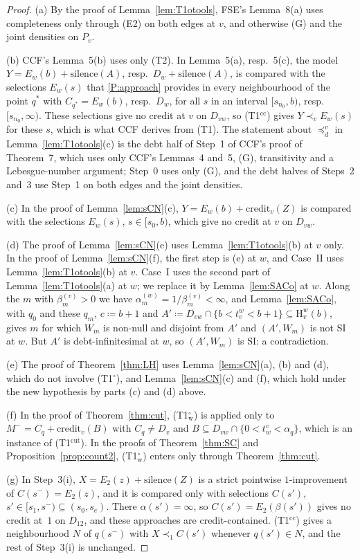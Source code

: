 \documentclass[11pt]{article}
\theoremstyle{definition}\newtheorem{definition}[theorem]{Definition}
\theoremstyle{remark}\newtheorem{remark}[theorem]{Remark}
\newcommand{\cred}{\mathrm{credit}}
\newcommand{\sil}{\mathrm{silence}}
\newcommand{\Hi}[3]{\mathrm H^{#1}_{#2}(#3)}
\newcommand{\Tw}{\textup{(T1$^\circ_{\mathrm w}$)}}
\newcommand{\To}{\textup{(T1$^\circ$)}}
\newcommand{\Tcc}{\textup{(T1$^{\mathrm{cc}}$)}}
\newcommand{\Tcut}{\textup{(T1$^{\mathrm{cut}}$)}}
\begin{document}
\begin{proof}
(a) By the proof of Lemma~\ref{lem:T1otools}, FSE's Lemma~8(a) uses
completeness only through (E2) on both edges at $v$, and otherwise (G) and
the joint densities on $P_v$.

(b) CCF's Lemma~5(b) uses only (T2). In Lemma~5(a), resp.\ 5(c), the model
$Y=E_w(b)+\sil(A)$, resp.\ $D_w+\sil(A)$, is compared with the selections
$E_w(s)$ that \ref{P:approach} provides in every neighbourhood of the point
$q^*$ with $C_{q^*}=E_w(b)$, resp.\ $D_w$, for all $s$ in an interval
$[s_{n_0},b)$, resp.\ $[s_{n_0},\infty)$. These selections give no credit
at $v$ on $D_{vw}$, so \Tcc{} gives $Y\prec_vE_w(s)$ for these $s$, which is
what CCF derives from (T1). The statement about $\preceq^v_d$ in
Lemma~\ref{lem:T1otools}(c) is the debt half of Step~1 of CCF's proof of
Theorem~7, which uses only CCF's Lemmas~4 and~5, (G), transitivity and a
Lebesgue-number argument; Step~0 uses only (G), and the debt halves of
Steps~2 and~3 use Step~1 on both edges and the joint densities.

(c) In the proof of Lemma~\ref{lem:sCN}(c), $Y=E_w(b)+\cred_v(Z)$ is
compared with the selections $E_w(s)$, $s\in[s_0,b)$, which give no credit
at $v$ on $D_{vw}$.

(d) The proof of Lemma~\ref{lem:sCN}(e) uses Lemma~\ref{lem:T1otools}(b) at
$v$ only. In the proof of Lemma~\ref{lem:sCN}(f), the first step is (e) at
$w$, and Case~II uses Lemma~\ref{lem:T1otools}(b) at $v$. Case~I uses the
second part of Lemma~\ref{lem:T1otools}(a) at $w$; we replace it by
Lemma~\ref{lem:SACo} at $w$. Along the $m$ with $\beta^{(v)}_m>0$ we have
$\alpha^{(w)}_m=1/\beta^{(v)}_m<\infty$, and Lemma~\ref{lem:SACo}, with
$q_0$ and these $q_m$, $c\coloneqq b+1$ and $A'\coloneqq D_{vw}\cap\{b<
t^w_v<b+1\}\subseteq\Hi wvb$, gives $m$ for which $W_m$ is non-null and
disjoint from $A'$ and $(A',W_m)$ is not SI at $w$. But $A'$ is
debt-infinitesimal at $w$, so $(A',W_m)$ is SI: a contradiction.

(e) The proof of Theorem~\ref{thm:LH} uses Lemma~\ref{lem:sCN}(a), (b) and
(d), which do not involve \To, and Lemma~\ref{lem:sCN}(c) and (f), which
hold under the new hypothesis by parts (c) and (d) above.

(f) In the proof of Theorem~\ref{thm:cut}, \Tw{} is applied only to
$M^-=C_q+\cred_v(B)$ with $C_q\ne D_v$ and $B\subseteq D_{vw}\cap\{0<
t^v_w<\alpha_q\}$, which is an instance of \Tcut. In the proofs of
Theorem~\ref{thm:SC} and Proposition~\ref{prop:count2}, \Tw{} enters only
through Theorem~\ref{thm:cut}.

(g) In Step~3(i), $X=E_2(z)+\sil(Z)$ is a strict pointwise $1$-improvement of
$C(s^-)=E_2(z)$, and it is compared only with selections $C(s')$,
$s'\in[s_1,s^-)\subseteq(s_0,s_e)$. There $\alpha(s')=\infty$, so
$C(s')=E_2(\beta(s'))$ gives no credit at~$1$ on $D_{12}$, and these
approaches are credit-contained. \Tcc{} gives a neighbourhood $N$ of
$q(s^-)$ with $X\prec_1C(s')$ whenever $q(s')\in N$, and the rest of Step~3(i)
is unchanged.
\end{proof}
\end{document}
